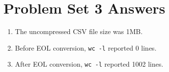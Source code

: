 \documentclass[12pt]{article}
\begin{document}
\section*{Problem Set 3 Answers}
\begin{enumerate}
    \item The uncompressed CSV file size was 1MB.
    \item Before EOL conversion, \texttt{wc -l} reported 0 lines.
    \item After EOL conversion, \texttt{wc -l} reported 1002 lines.
\end{enumerate}
\end{document}
